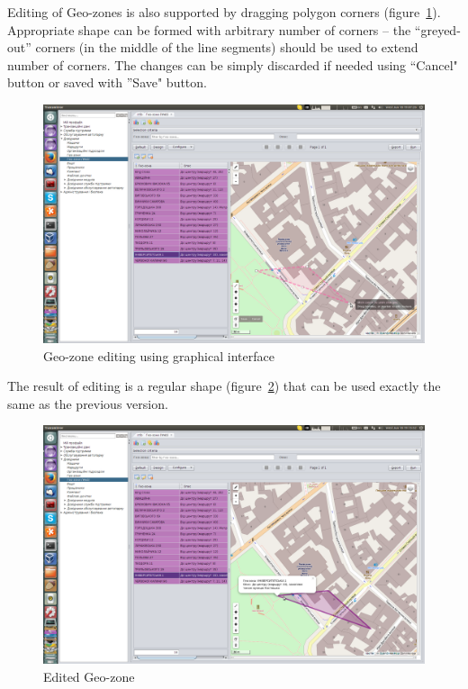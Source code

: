 \newpage
Editing of Geo-zones is also supported by dragging polygon corners (figure~\ref{fig:05}). Appropriate shape can be formed with arbitrary number of corners -- the ``greyed-out'' corners (in the middle of the line segments) should be used to extend number of corners. The changes can be simply discarded if needed using ``Cancel" button or saved with ''Save" button.

\begin{figure}[H]
\centering
\includegraphics[width=\linewidth]{chapters/01-geozones/images/05-editing-geo-zone-using-graphical-interface.png}
\caption{Geo-zone editing using graphical interface}\label{fig:05}
\end{figure}

\newpage
The result of editing is a regular shape (figure~\ref{fig:06}) that can be used exactly the same as the previous version.

\begin{figure}[H]
\centering
\includegraphics[width=\linewidth]{chapters/01-geozones/images/06-edited-geo-zone.png}
\caption{Edited Geo-zone}\label{fig:06}
\end{figure}

